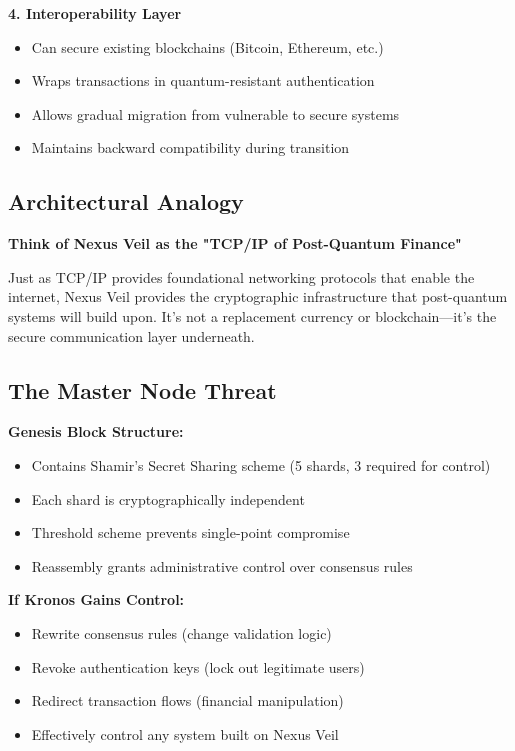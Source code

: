 \documentclass[12pt,oneside]{book}
\begin{document}
\textbf{4. Interoperability Layer}
\begin{itemize}
\item Can secure existing blockchains (Bitcoin, Ethereum, etc.)
\item Wraps transactions in quantum-resistant authentication
\item Allows gradual migration from vulnerable to secure systems
\item Maintains backward compatibility during transition
\end{itemize}

\subsection{Architectural Analogy}

\textcolor{neongreen}{\textbf{Think of Nexus Veil as the "TCP/IP of Post-Quantum Finance"}}

Just as TCP/IP provides foundational networking protocols that enable the internet, Nexus Veil provides the cryptographic infrastructure that post-quantum systems will build upon. It's not a replacement currency or blockchain—it's the secure communication layer underneath.

\subsection{The Master Node Threat}

\textbf{Genesis Block Structure:}
\begin{itemize}
\item Contains Shamir's Secret Sharing scheme (5 shards, 3 required for control)
\item Each shard is cryptographically independent
\item Threshold scheme prevents single-point compromise
\item Reassembly grants administrative control over consensus rules
\end{itemize}

\textbf{If Kronos Gains Control:}
\begin{itemize}
\item Rewrite consensus rules (change validation logic)
\item Revoke authentication keys (lock out legitimate users)
\item Redirect transaction flows (financial manipulation)
\item Effectively control any system built on Nexus Veil
\end{itemize}
\end{document}
